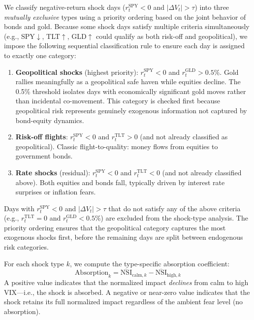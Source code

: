 \documentclass[12pt,a4paper]{article}
\begin{document}
We classify negative-return shock days ($r_t^{\text{SPY}} < 0$ and $|\Delta V_t| > \tau$) into three \textit{mutually exclusive} types using a priority ordering based on the joint behavior of bonds and gold. Because some shock days satisfy multiple criteria simultaneously (e.g., SPY$\downarrow$, TLT$\uparrow$, GLD$\uparrow$ could qualify as both risk-off and geopolitical), we impose the following sequential classification rule to ensure each day is assigned to exactly one category:
\begin{enumerate}
    \item \textbf{Geopolitical shocks} (highest priority): $r_t^{\text{SPY}} < 0$ and $r_t^{\text{GLD}} > 0.5\%$. Gold rallies meaningfully as a geopolitical safe haven while equities decline. The 0.5\% threshold isolates days with economically significant gold moves rather than incidental co-movement. This category is checked first because geopolitical risk represents genuinely exogenous information not captured by bond-equity dynamics.
    \item \textbf{Risk-off flights}: $r_t^{\text{SPY}} < 0$ and $r_t^{\text{TLT}} > 0$ (and not already classified as geopolitical). Classic flight-to-quality: money flows from equities to government bonds.
    \item \textbf{Rate shocks} (residual): $r_t^{\text{SPY}} < 0$ and $r_t^{\text{TLT}} < 0$ (and not already classified above). Both equities and bonds fall, typically driven by interest rate surprises or inflation fears.
\end{enumerate}
Days with $r_t^{\text{SPY}} < 0$ and $|\Delta V_t| > \tau$ that do not satisfy any of the above criteria (e.g., $r_t^{\text{TLT}} = 0$ and $r_t^{\text{GLD}} < 0.5\%$) are excluded from the shock-type analysis. The priority ordering ensures that the geopolitical category captures the most exogenous shocks first, before the remaining days are split between endogenous risk categories.

For each shock type $k$, we compute the type-specific absorption coefficient:
\begin{equation}
\text{Absorption}_k = \overline{\text{NSI}}_{\text{calm}, k} - \overline{\text{NSI}}_{\text{high}, k}
\label{eq:type_absorption}
\end{equation}
A positive value indicates that the normalized impact \textit{declines} from calm to high VIX---i.e., the shock is absorbed. A negative or near-zero value indicates that the shock retains its full normalized impact regardless of the ambient fear level (no absorption).
\end{document}
